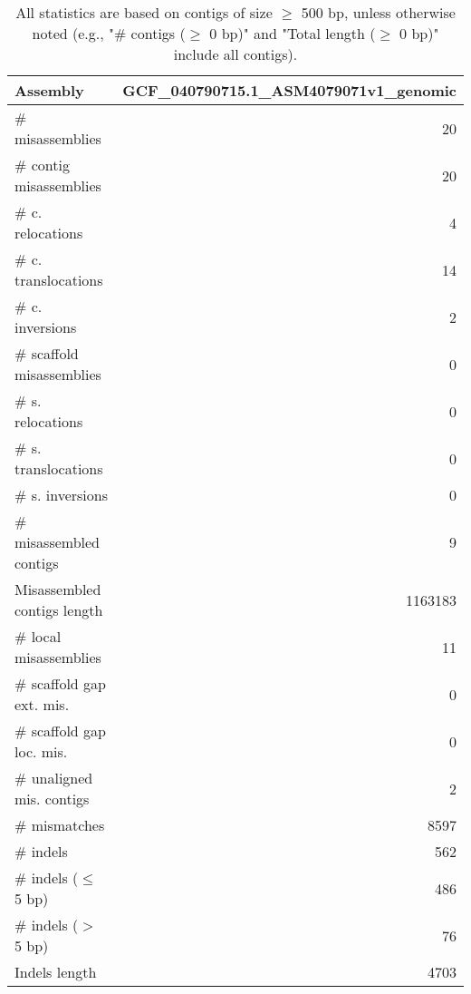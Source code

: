 \documentclass[12pt,a4paper]{article}
\begin{document}
\begin{table}[ht]
\begin{center}
\caption{All statistics are based on contigs of size $\geq$ 500 bp, unless otherwise noted (e.g., "\# contigs ($\geq$ 0 bp)" and "Total length ($\geq$ 0 bp)" include all contigs).}
\begin{tabular}{|l*{1}{|r}|}
\hline
Assembly & GCF\_040790715.1\_ASM4079071v1\_genomic \\ \hline
\# misassemblies & 20 \\ \hline
\hspace{2mm}\# contig misassemblies & 20 \\ \hline
\hspace{5mm}\# c. relocations & 4 \\ \hline
\hspace{5mm}\# c. translocations & 14 \\ \hline
\hspace{5mm}\# c. inversions & 2 \\ \hline
\hspace{2mm}\# scaffold misassemblies & 0 \\ \hline
\hspace{5mm}\# s. relocations & 0 \\ \hline
\hspace{5mm}\# s. translocations & 0 \\ \hline
\hspace{5mm}\# s. inversions & 0 \\ \hline
\# misassembled contigs & 9 \\ \hline
Misassembled contigs length & 1163183 \\ \hline
\# local misassemblies & 11 \\ \hline
\# scaffold gap ext. mis. & 0 \\ \hline
\# scaffold gap loc. mis. & 0 \\ \hline
\# unaligned mis. contigs & 2 \\ \hline
\# mismatches & 8597 \\ \hline
\# indels & 562 \\ \hline
\hspace{5mm}\# indels ($\leq$ 5 bp) & 486 \\ \hline
\hspace{5mm}\# indels ($>$ 5 bp) & 76 \\ \hline
Indels length & 4703 \\ \hline
\end{tabular}
\end{center}
\end{table}
\end{document}
